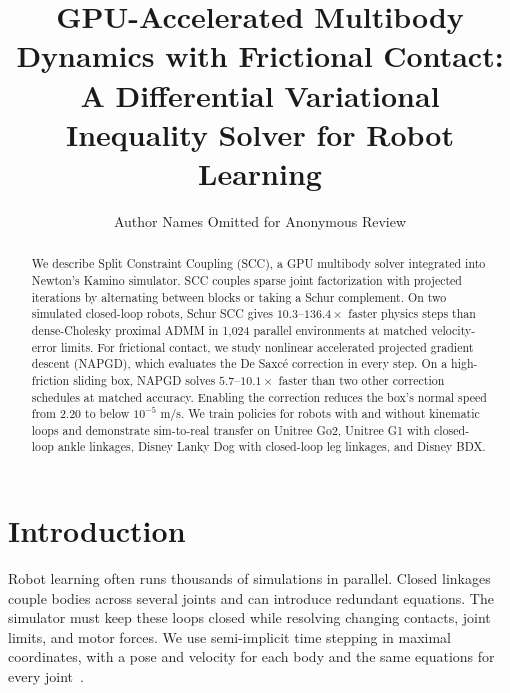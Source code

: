 \documentclass[conference]{IEEEtran}
\begin{document}
\title{GPU-Accelerated Multibody Dynamics with Frictional Contact: A Differential Variational Inequality Solver for Robot Learning}
\author{Author Names Omitted for Anonymous Review}
\maketitle
\thispagestyle{empty}
\begin{abstract}
We describe Split Constraint Coupling (SCC), a GPU multibody solver integrated into Newton's Kamino simulator. SCC couples sparse joint factorization with projected iterations by alternating between blocks or taking a Schur complement. On two simulated closed-loop robots, Schur SCC gives \(10.3\)--\(136.4\times\) faster physics steps than dense-Cholesky proximal ADMM in 1,024 parallel environments at matched velocity-error limits. For frictional contact, we study nonlinear accelerated projected gradient descent (NAPGD), which evaluates the De Saxc\'e correction in every step. On a high-friction sliding box, NAPGD solves \(5.7\)--\(10.1\times\) faster than two other correction schedules at matched accuracy. Enabling the correction reduces the box's normal speed from 2.20 to below \(10^{-5}\) m/s. We train policies for robots with and without kinematic loops and demonstrate sim-to-real transfer on Unitree Go2, Unitree G1 with closed-loop ankle linkages, Disney Lanky Dog with closed-loop leg linkages, and Disney BDX.
\end{abstract}
\IEEEpeerreviewmaketitle

\section{Introduction}
Robot learning often runs thousands of simulations in parallel. Closed linkages couple bodies across several joints and can introduce redundant equations. The simulator must keep these loops closed while resolving changing contacts, joint limits, and motor forces. We use semi-implicit time stepping in maximal coordinates, with a pose and velocity for each body and the same equations for every joint~\citep{stewart}.
\end{document}
